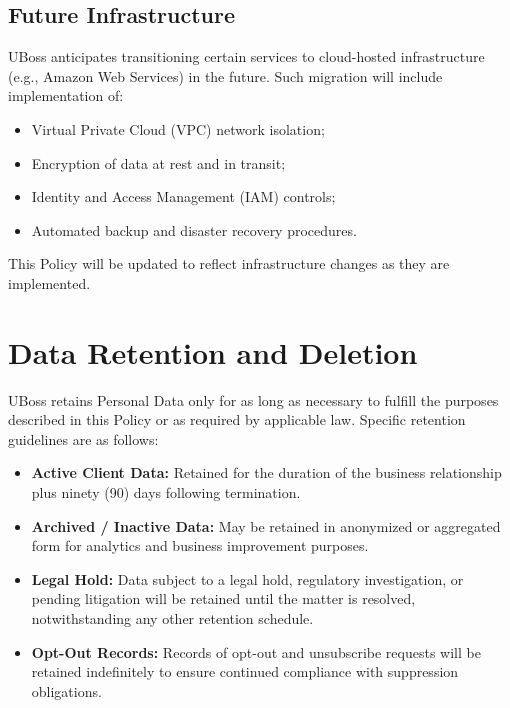 \documentclass[11pt, letterpaper]{article}
\begin{document}
\subsection{Future Infrastructure}

UBoss anticipates transitioning certain services to cloud-hosted infrastructure (e.g.,
Amazon Web Services) in the future. Such migration will include implementation of:

\begin{itemize}
    \item Virtual Private Cloud (VPC) network isolation;
    \item Encryption of data at rest and in transit;
    \item Identity and Access Management (IAM) controls;
    \item Automated backup and disaster recovery procedures.
\end{itemize}

This Policy will be updated to reflect infrastructure changes as they are implemented.

\section{Data Retention and Deletion}

UBoss retains Personal Data only for as long as necessary to fulfill the purposes
described in this Policy or as required by applicable law. Specific retention
guidelines are as follows:

\begin{itemize}
    \item \textbf{Active Client Data:} Retained for the duration of the business
          relationship plus ninety (90) days following termination.

    \item \textbf{Archived / Inactive Data:} May be retained in anonymized or
          aggregated form for analytics and business improvement purposes.

    \item \textbf{Legal Hold:} Data subject to a legal hold, regulatory investigation,
          or pending litigation will be retained until the matter is resolved,
          notwithstanding any other retention schedule.

    \item \textbf{Opt-Out Records:} Records of opt-out and unsubscribe requests will be
          retained indefinitely to ensure continued compliance with suppression
          obligations.
\end{itemize}
\end{document}
